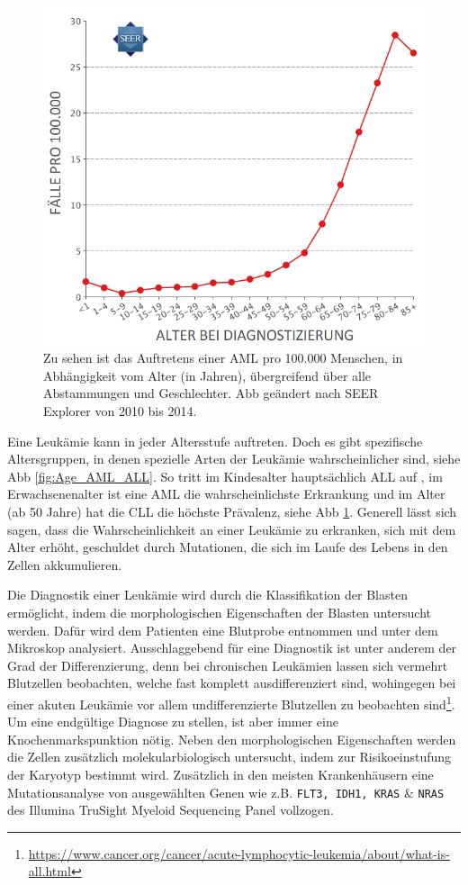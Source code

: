 \begin{figure}
\centering
\includegraphics[width=.90\textwidth]{images/Alter_AML_2014.png}
\caption{Zu sehen ist das Auftretens einer \ac{AML} pro 100.000 Menschen, in Abhängigkeit vom Alter (in Jahren), übergreifend über alle Abstammungen und Geschlechter. \ac{Abb} geändert nach SEER \cite{Howlader.2014} Explorer\protect\footnotemark{} von 2010 bis 2014.}
\label{fig:Alter_AML}
\end{figure}
Eine Leukämie kann in jeder Altersstufe auftreten. Doch es gibt spezifische Altersgruppen, in denen spezielle Arten der Leukämie wahrscheinlicher sind, siehe \ac{Abb} \ref{fig:Age_AML_ALL}. So tritt im Kindesalter hauptsächlich \ac{ALL} auf \cite{Rubnitz.2012}, im Erwachsenenalter ist eine \ac{AML} die wahrscheinlichste Erkrankung und im Alter (ab 50 Jahre) hat die \ac{CLL} die höchste Prävalenz, siehe \ac{Abb} \ref{fig:Alter_AML}. Generell lässt sich sagen, dass die Wahrscheinlichkeit an einer Leukämie zu erkranken, sich mit dem Alter erhöht, geschuldet durch Mutationen, die sich im Laufe des Lebens in den Zellen akkumulieren.

Die Diagnostik einer Leukämie wird durch die Klassifikation der Blasten ermöglicht, indem die morphologischen Eigenschaften der Blasten untersucht werden. Dafür wird dem Patienten eine Blutprobe entnommen und unter dem Mikroskop analysiert. Ausschlaggebend für eine Diagnostik ist unter anderem der Grad der Differenzierung, denn bei chronischen Leukämien lassen sich vermehrt Blutzellen beobachten, welche fast komplett ausdifferenziert sind, wohingegen bei einer akuten Leukämie vor allem undifferenzierte Blutzellen zu beobachten sind\footnote{\url{https://www.cancer.org/cancer/acute-lymphocytic-leukemia/about/what-is-all.html}}. Um eine endgültige Diagnose zu stellen, ist aber immer eine Knochenmarkspunktion nötig. Neben den morphologischen Eigenschaften werden die Zellen zusätzlich molekularbiologisch untersucht, indem zur Risikoeinstufung der Karyotyp bestimmt wird. Zusätzlich in den meisten Krankenhäusern eine Mutationsanalyse von ausgewählten Genen wie z.B. \texttt{FLT3, IDH1, KRAS} \& \texttt{NRAS} des Illumina TruSight Myeloid Sequencing Panel vollzogen.

